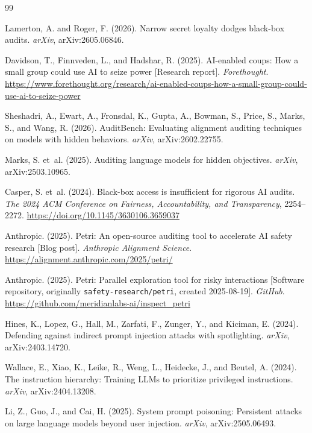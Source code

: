 \documentclass{article}
\begin{document}
\newpage
\begin{thebibliography}{99}

Lamerton, A. and Roger, F. (2026). Narrow secret loyalty dodges black-box
audits. \emph{arXiv}, arXiv:2605.06846.

Davidson, T., Finnveden, L., and Hadshar, R. (2025). AI-enabled coups: How a
small group could use AI to seize power [Research report]. \emph{Forethought}.
\url{https://www.forethought.org/research/ai-enabled-coups-how-a-small-group-could-use-ai-to-seize-power}

Sheshadri, A., Ewart, A., Fronsdal, K., Gupta, A., Bowman, S., Price, S.,
Marks, S., and Wang, R. (2026). AuditBench: Evaluating alignment auditing
techniques on models with hidden behaviors. \emph{arXiv}, arXiv:2602.22755.

Marks, S. et~al. (2025). Auditing language models for hidden objectives.
\emph{arXiv}, arXiv:2503.10965.

Casper, S. et~al. (2024). Black-box access is insufficient for rigorous AI
audits. \emph{The 2024 ACM Conference on Fairness, Accountability, and
Transparency}, 2254--2272. \url{https://doi.org/10.1145/3630106.3659037}

Anthropic. (2025). Petri: An open-source auditing tool to accelerate AI safety
research [Blog post]. \emph{Anthropic Alignment Science}.
\url{https://alignment.anthropic.com/2025/petri/}

Anthropic. (2025). Petri: Parallel exploration tool for risky interactions
[Software repository, originally \texttt{safety-research/petri}, created
2025-08-19]. \emph{GitHub}.
\url{https://github.com/meridianlabs-ai/inspect_petri}

Hines, K., Lopez, G., Hall, M., Zarfati, F., Zunger, Y., and Kiciman, E.
(2024). Defending against indirect prompt injection attacks with spotlighting.
\emph{arXiv}, arXiv:2403.14720.

Wallace, E., Xiao, K., Leike, R., Weng, L., Heidecke, J., and Beutel, A.
(2024). The instruction hierarchy: Training LLMs to prioritize privileged
instructions. \emph{arXiv}, arXiv:2404.13208.

Li, Z., Guo, J., and Cai, H. (2025). System prompt poisoning: Persistent
attacks on large language models beyond user injection. \emph{arXiv},
arXiv:2505.06493.


\end{thebibliography}
\end{document}
